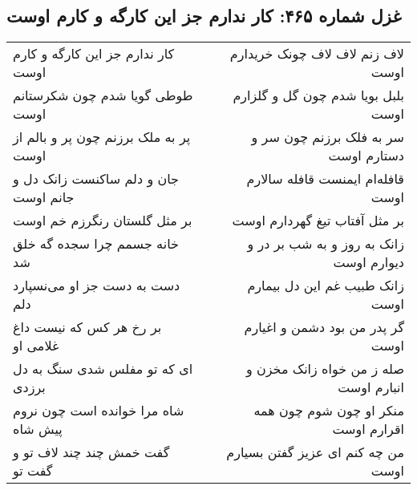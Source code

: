 \begin{center}
\section*{غزل شماره ۴۶۵: کار ندارم جز این کارگه و کارم اوست}
\label{sec:0465}
\begin{longtable}{l p{0.5cm} r}
کار ندارم جز این کارگه و کارم اوست
&&
لاف زنم لاف لاف چونک خریدارم اوست
\\
طوطی گویا شدم چون شکرستانم اوست
&&
بلبل بویا شدم چون گل و گلزارم اوست
\\
پر به ملک برزنم چون پر و بالم از اوست
&&
سر به فلک برزنم چون سر و دستارم اوست
\\
جان و دلم ساکنست زانک دل و جانم اوست
&&
قافله‌ام ایمنست قافله سالارم اوست
\\
بر مثل گلستان رنگرزم خم اوست
&&
بر مثل آفتاب تیغ گهردارم اوست
\\
خانه جسمم چرا سجده گه خلق شد
&&
زانک به روز و به شب بر در و دیوارم اوست
\\
دست به دست جز او می‌نسپارد دلم
&&
زانک طبیب غم این دل بیمارم اوست
\\
بر رخ هر کس که نیست داغ غلامی او
&&
گر پدر من بود دشمن و اغیارم اوست
\\
ای که تو مفلس شدی سنگ به دل برزدی
&&
صله ز من خواه زانک مخزن و انبارم اوست
\\
شاه مرا خوانده است چون نروم پیش شاه
&&
منکر او چون شوم چون همه اقرارم اوست
\\
گفت خمش چند چند لاف تو و گفت تو
&&
من چه کنم ای عزیز گفتن بسیارم اوست
\\
\end{longtable}
\end{center}
